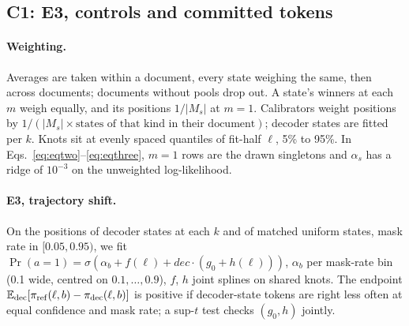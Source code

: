 
\renewcommand{\dbltopfraction}{0.95}\renewcommand{\textfraction}{0.05}\setcounter{dbltopnumber}{3}%
\subsection{C1: E3, controls and committed tokens}
\label{sec:c1-app}

\paragraph{Weighting.}
Averages are taken within a document, every state weighing the same, then across documents;
documents without pools drop out. A state's \VivaNPools{} winners at each
$m$ weigh equally, and its positions $1/|M_s|$ at $m=1$. Calibrators weight positions by
$1/(|M_s|\times\text{states of that kind in their document})$; decoder states are fitted per $k$.
Knots sit at evenly spaced quantiles of fit-half $\ell$, 5\% to 95\%. In
Eqs.~\ref{eq:eqtwo}--\ref{eq:eqthree}, $m=1$ rows are the drawn singletons and $\alpha_s$ has a
ridge of $10^{-3}$ on the unweighted log-likelihood.

\paragraph{E3, trajectory shift.}
On the positions of decoder states at each $k$ and of matched uniform states, mask rate in $[0.05,0.95)$, we fit
$\Pr(a{=}1)=\sigma(\alpha_b+f(\ell)+\textit{dec}\cdot(g_0+h(\ell)))$, $\alpha_b$ per mask-rate bin (0.1 wide, centred on $0.1,\dots,0.9$), $f$, $h$ joint splines on \VivaKnots{} shared knots.
The endpoint $\mathbb{E}_{\mathrm{dec}}[\pi_{\mathrm{ref}}(\ell,b)-\pi_{\mathrm{dec}}(\ell,b)]$ is positive if
decoder-state tokens are right less often at equal confidence and mask rate; a sup-$t$ test checks $(g_0,h)$ jointly.

